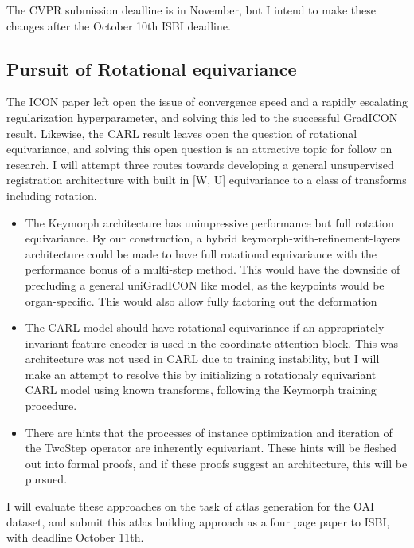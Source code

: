 \documentclass{article}
\begin{document}
The CVPR submission deadline is in November, but I intend to make these changes after the October 10th ISBI deadline.

\subsection{Pursuit of Rotational equivariance}

The ICON paper left open the issue of convergence speed and a rapidly escalating regularization hyperparameter, and solving this led to the successful GradICON result. Likewise, the CARL result leaves open the question of rotational equivariance, and solving this open question is an attractive topic for follow on research. I will attempt three routes towards developing a general unsupervised registration architecture with built in [W, U] equivariance to a class of transforms including rotation.

\begin{itemize}
	\item The Keymorph architecture has unimpressive performance but full rotation equivariance. By our construction, a hybrid keymorph-with-refinement-layers architecture could be made to have full rotational equivariance with the performance bonus of a multi-step method. This would have the downside of precluding a general uniGradICON like model, as the keypoints would be organ-specific. This would also allow fully factoring out the deformation 

	\item The CARL model should have rotational equivariance if an appropriately invariant feature encoder is used in the coordinate attention block. This was architecture was not used in CARL due to training instability, but I will make an attempt to resolve this by initializing a rotationaly equivariant CARL model using known transforms, following the Keymorph training procedure.

	\item There are hints that the processes of instance optimization and iteration of the TwoStep operator are inherently equivariant. These hints will be fleshed out into formal proofs, and if these proofs suggest an architecture, this will be pursued.
\end{itemize}

I will evaluate these approaches on the task of atlas generation for the OAI dataset, and submit this atlas building approach as a four page paper to ISBI, with deadline October 11th.
\end{document}
